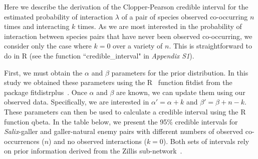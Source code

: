 \documentclass[12pt]{article}
\begin{document}
\begin{floatbox}{}
  
  Here we describe the derivation of the Clopper-Pearson credible interval for the estimated probability of interaction $\lambda$ of a pair of species observed co-occurring $n$ times and interacting $k$ times. As we are most interested in the probability of interaction between species pairs that have never been observed co-occurring, we consider only the case where $k=0$ over a variety of $n$. This is straightforward to do in R (see the function ``credible\_interval" in \emph{Appendix S1}). 


  First, we must obtain the $\alpha$ and $\beta$ parameters for the prior distribution. In this study we obtained these parameters using the R~\citep{R} function fitdist from the package fitdistrplus~\citep{fitdistrplus}. Once $\alpha$ and $\beta$ are known, we can update them using our observed data. Specifically, we are interested in $\alpha'=\alpha+k$ and $\beta'=\beta+n-k$. These parameters can then be used to calculate a credible interval using the R~\citep{R} function qbeta. In the table below, we present the 95\% credible intervals for \emph{Salix}-galler and galler-natural enemy pairs with different numbers of observed co-occurrences ($n$) and no observed interactions ($k=0$). Both sets of intervals rely on prior information derived from the Zillis sub-network~\citep{Kopelke2017}.



\end{floatbox}
\end{document}
